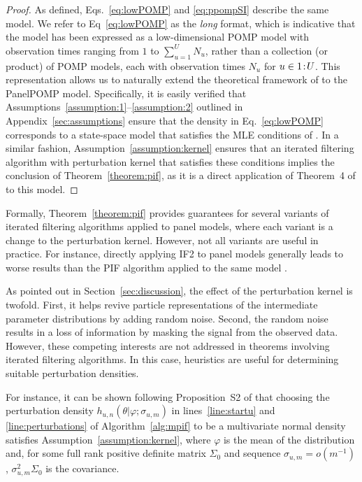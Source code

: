 \begin{proof}
  As defined, Eqs.~\ref{eq:lowPOMP} and \ref{eq:ppompSI} describe the same model. 
  We refer to Eq~\ref{eq:lowPOMP} as the \emph{long} format, which is indicative that the model has been expressed as a low-dimensional POMP model with observation times ranging from $1$ to $\sum_{u = 1}^U N_u$, rather than a collection (or product) of POMP models, each with observation times $N_u$ for $u \in {1}\!:\!{U}$. 
  This representation allows us to naturally extend the theoretical framework of \citet{chen24} to the PanelPOMP model.
  Specifically, it is easily verified that Assumptions~\ref{assumption:1}--\ref{assumption:2} outlined in Appendix~\ref{sec:assumptions} ensure that the density in Eq.~\ref{eq:lowPOMP} corresponds to a state-space model that satisfies the MLE conditions of \citet{chen24}. 
  In a similar fashion, Assumption~\ref{assumption:kernel} ensures that an iterated filtering algorithm with perturbation kernel that satisfies these conditions implies the conclusion of Theorem~\ref{theorem:pif}, as it is a direct application of Theorem~4 of \citet{chen24} to this model. 
  
    \end{proof}

  \noindent Formally, Theorem~\ref{theorem:pif} provides guarantees for several variants of iterated filtering algorithms applied to panel models, where each variant is a change to the perturbation kernel. 
  However, not all variants are useful in practice. 
    For instance, directly applying IF2 to panel models generally leads to worse results than the PIF algorithm applied to the same model \citep{breto20}.
  
  As pointed out in Section~\ref{sec:discussion}, the effect of the perturbation kernel is twofold. 
    First, it helps revive particle representations of the intermediate parameter distributions by adding random noise. 
    Second, the random noise results in a loss of information by masking the signal from the observed data. 
    However, these competing interests are not addressed in theorems involving iterated filtering algorithms.
    In this case, heuristics are useful for determining suitable perturbation densities. 
    
    For instance, it can be shown following Proposition~S2 of \citet{chen24} that choosing the perturbation density $h_{u, n}(\theta|\varphi; \sigma_{u, m})$ in lines~\ref{line:startu} and \ref{line:perturbations} of Algorithm~\ref{alg:mpif} to be a multivariate normal density satisfies Assumption~\ref{assumption:kernel}, where $\varphi$ is the mean of the distribution and, for some full rank positive definite matrix $\Sigma_0$ and sequence $\sigma_{u, m} = o(m^{-1})$, $\sigma^2_{u, m}\Sigma_0$ is the covariance.
    
